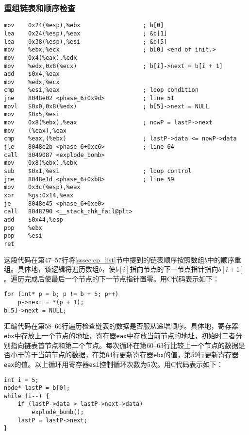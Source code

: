 \documentclass[a4paper, 11pt]{ctexart}
\begin{document}
\subsubsection{重组链表和顺序检查}
\begin{verbatim}
mov    0x24(%esp),%ebx                  ; b[0]
lea    0x24(%esp),%eax                  ; &b[1]
lea    0x38(%esp),%esi                  ; &b[5]
mov    %ebx,%ecx                        ; b[0] <end of init.>
mov    0x4(%eax),%edx
mov    %edx,0x8(%ecx)                   ; b[i]->next = b[i + 1]
add    $0x4,%eax
mov    %edx,%ecx
cmp    %esi,%eax                        ; loop condition
jne    8048e02 <phase_6+0x9d>           ; line 51
movl   $0x0,0x8(%edx)                   ; b[5]->next = NULL
mov    $0x5,%esi
mov    0x8(%ebx),%eax                   ; nowP = lastP->next
mov    (%eax),%eax
cmp    %eax,(%ebx)                      ; lastP->data <= nowP->data
jle    8048e2b <phase_6+0xc6>           ; line 64
call   8049087 <explode_bomb>
mov    0x8(%ebx),%ebx
sub    $0x1,%esi                        ; loop control
jne    8048e1d <phase_6+0xb8>           ; line 59
mov    0x3c(%esp),%eax
xor    %gs:0x14,%eax
je     8048e45 <phase_6+0xe0>
call   8048790 <__stack_chk_fail@plt>
add    $0x44,%esp
pop    %ebx
pop    %esi
ret
\end{verbatim}

这段代码在第47--57行将\ref{sssec:cp_list}节中提到的链表顺序按照数组$b$中的顺序重组。具体地，该逻辑将遍历数组$b$，使$b[i]$指向节点的下一节点指针指向$b[i+1]$。遍历完成后使最后一个节点的下一节点指针置零。用C代码表示如下：

\begin{verbatim}
for (int* p = b; p != b + 5; p++)
    p->next = *(p + 1);
b[5]->next = NULL;
\end{verbatim}

汇编代码在第58--66行遍历检查链表的数据是否服从递增顺序。具体地，寄存器\texttt{ebx}中存放上一个节点的地址，寄存器\texttt{eax}中存放当前节点的地址，初始时二者分别指向链表首节点和第二个节点。每次循环在第60--63行比较上一个节点的数据是否小于等于当前节点的数据，在第64行更新寄存器\texttt{ebx}的值，第59行更新寄存器\texttt{eax}的值。以上循环用寄存器\texttt{esi}控制循环次数为5次。用C代码表示如下：

\begin{verbatim}
int i = 5;
node* lastP = b[0];
while (i--) {
    if (lastP->data > lastP->next->data)
        explode_bomb();
    lastP = lastP->next;
}
\end{verbatim}
\end{document}

